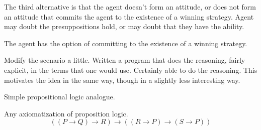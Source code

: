 \documentclass[10pt]{article}
\begin{document}
\begin{note}
  The third alternative is that the agent doesn't form an attitude, or does not form an attitude that commits the agent to the existence of a winning strategy.
  Agent may doubt the presuppositions hold, or may doubt that they have the ability.

  The agent has the option of committing to the existence of a winning strategy.
\end{note}

\begin{note}
  Modify the scenario a little.
  Written a program that does the reasoning, fairly explicit, in the terms that one would use.
  Certainly able to do the reasoning.
  This motivates the idea in the same way, though in a slightly less interesting way.
\end{note}

\begin{note}
Simple propositional logic analogue.

Any axiomatization of proposition logic.
\[
  ((P \rightarrow Q) \rightarrow R) \rightarrow ((R \rightarrow P) \rightarrow (S \rightarrow P))
\]
\cite{Lukasiewicz:1948aa}
\end{note}
\end{document}
